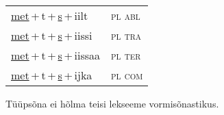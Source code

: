 \begin{minipage}{\textwidth}
\begin{sideways}
\begin{tabular}{l l}
\underline{met}\,+\,t\,+\,\underline{s}\,+\,iilt & \textsc{ pl abl } \\
\underline{met}\,+\,t\,+\,\underline{s}\,+\,iissi & \textsc{ pl tra } \\
\underline{met}\,+\,t\,+\,\underline{s}\,+\,iissaa & \textsc{ pl ter } \\
\underline{met}\,+\,t\,+\,\underline{s}\,+\,ijka & \textsc{ pl com } \\
\end{tabular}
\end{sideways}
\label{tab:tüüpsõnamall-mettse}

\end{minipage}

 
\vspace{1em}
\noindent Tüüpsõna ei hõlma teisi lekseeme vormi\-sõnastikus.
